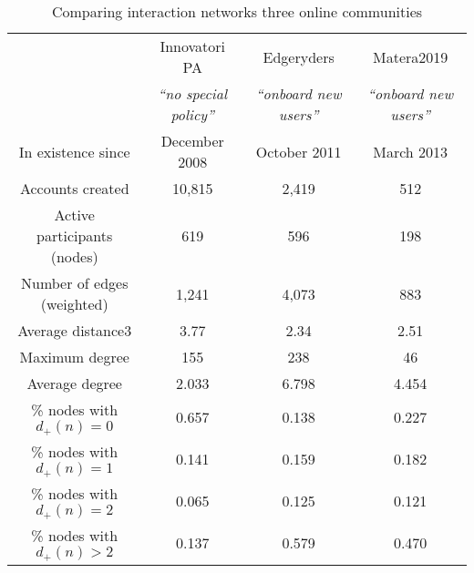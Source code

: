\begin{table*}[t]
\centering 
\begin{tabular}{| c | c | c | c |} 
\hline 
& Innovatori PA & Edgeryders & Matera2019\\ 
& \emph{``no special policy''} & \emph{``onboard new users''} & \emph{``onboard new users''}\\ 
\hline 
In existence since & December 2008 & October 2011 & March 2013 \\
Accounts created & 10,815 & 2,419 & 512 \\
\hline 
Active participants (nodes) & 619 & 596 & 198 \\
Number of edges (weighted) & 1,241 & 4,073 & 883 \\
\hline 
Average distance3 & 3.77 & 2.34 & 2.51 \\
Maximum degree & 155 & 238 & 46 \\
Average degree & 2.033 & 6.798 & 4.454 \\
\hline 
\% nodes with $d_+(n) = 0$ & 0.657 & 0.138 & 0.227 \\
\% nodes with $d_+(n) = 1$ & 0.141 & 0.159 & 0.182 \\
\% nodes with $d_+(n) = 2$ & 0.065 & 0.125 & 0.121 \\
\% nodes with $d_+(n) > 2$ & 0.137 & 0.579 & 0.470 \\
\hline 
\end{tabular}
\caption{Comparing interaction networks three online communities}
\label{tab:template}
\end{table*}



